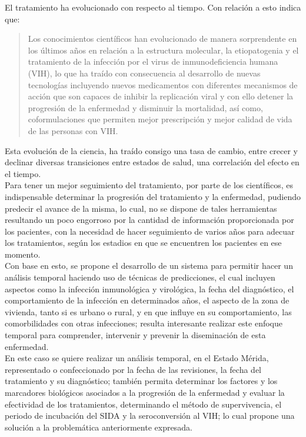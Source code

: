 El tratamiento ha evolucionado con respecto al tiempo. Con relaci\'on a esto \citet{mpps} indica que: \\

\begin{quote}
Los conocimientos cient\'ificos han evolucionado de manera sorprendente en los \'ultimos a\~nos en relaci\'on a la estructura molecular, la etiopatogenia y el tratamiento de la infecci\'on por el virus de inmunodeficiencia humana (VIH), lo que ha tra\'ido con consecuencia al desarrollo de nuevas tecnolog\'ias incluyendo nuevos medicamentos con diferentes mecanismos de acci\'on que son capaces de inhibir la replicaci\'on viral y con ello detener la progresi\'on de la enfermedad y disminuir la mortalidad, as\'i como, coformulaciones que permiten mejor prescripci\'on y mejor calidad de vida de las personas con VIH.
\end{quote} 
 


Esta evoluci\'on de la ciencia, ha tra\'ido consigo una tasa de cambio, entre crecer y declinar diversas transiciones entre estados de salud, una correlaci\'on del efecto en el tiempo. \\

Para tener un mejor seguimiento del tratamiento, por parte de los cient\'ificos, es indispensable determinar la progresi\'on del tratamiento y la enfermedad, pudiendo predecir el avance de la misma, lo cual, no se dispone de tales herramientas resultando un poco engorroso por la cantidad de informaci\'on proporcionada por los pacientes, con la necesidad de hacer seguimiento de varios a\~nos para adecuar los tratamientos, seg\'un los estadios en que se encuentren los pacientes en ese momento. \\

	Con base en esto, se propone el desarrollo de un sistema para permitir hacer un an\'alisis temporal haciendo uso de t\'ecnicas de predicciones, el cual incluyen aspectos como la infecci\'on inmunol\'ogica y virol\'ogica, la fecha del diagn\'ostico, el comportamiento de la infecci\'on en determinados a\~nos, el aspecto de la zona de vivienda, tanto si es urbano o rural, y en que influye en su comportamiento, las comorbilidades con otras infecciones; resulta interesante realizar este enfoque temporal para comprender, intervenir y prevenir la diseminaci\'on de esta enfermedad.\\
	
	 En este caso se quiere realizar un an\'alisis temporal, en el Estado M\'erida, representado o confeccionado por la fecha de las revisiones, la fecha del tratamiento y su diagn\'ostico; tambi\'en permita determinar los factores y los marcadores biol\'ogicos asociados a la progresi\'on de la enfermedad y evaluar la efectividad de los tratamientos, determinando el m\'etodo de supervivencia, el periodo de incubaci\'on del SIDA y la seroconversi\'on al VIH; lo cual propone una soluci\'on a la problem\'atica anteriormente expresada. \\

